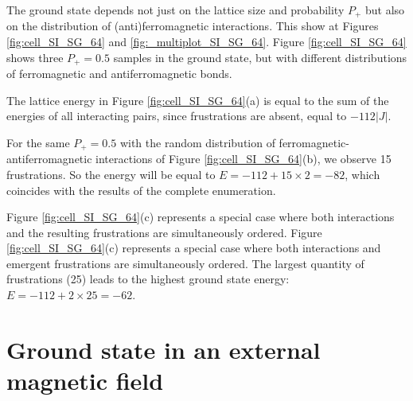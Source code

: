 \documentclass[preprint,12pt]{elsarticle}
\begin{document}
	The ground state depends not just on the lattice size and probability $P_+$ but also on the distribution of (anti)ferromagnetic interactions. This show at Figures \ref{fig:cell_SI_SG_64} and \ref{fig:_multiplot_SI_SG_64}. Figure \ref{fig:cell_SI_SG_64} shows three $P_+ = 0.5$ samples in the ground state, but with different distributions of ferromagnetic and antiferromagnetic bonds.
	
	The lattice energy in Figure \ref{fig:cell_SI_SG_64}(a) is equal to the sum of the energies of all interacting pairs, since frustrations are absent, equal to $-112|J|$.
	
	For the same $P_+ = 0.5$ with the random distribution of ferromagnetic-antiferromagnetic interactions of Figure \ref{fig:cell_SI_SG_64}(b), we observe 15 frustrations. So the energy will be equal to $E = -112 + 15\times2 = -82$, which coincides with the results of the complete enumeration.
	
	Figure \ref{fig:cell_SI_SG_64}(c) represents a special case where both interactions and the resulting frustrations are simultaneously ordered. Figure \ref{fig:cell_SI_SG_64}(c) represents a special case where both interactions and emergent frustrations are simultaneously ordered. The largest quantity of frustrations (25) leads to the highest ground state energy: $E = -112 + 2\times25 = -62$.
	

	\section{Ground state in an external magnetic field}
\end{document}

